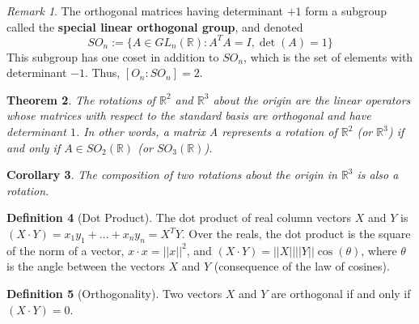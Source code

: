 \documentclass[12pt]{article}
\newtheorem{thm}{Theorem}[section]
\newtheorem{cor}[thm]{Corollary}
\theoremstyle{definition}
\newtheorem{defn}[thm]{Definition}
\theoremstyle{remark}
\newtheorem{rmk}[thm]{Remark}
\numberwithin{equation}{section}
\newcommand\R{\mathbb R}    %
\newcommand\B[1]{\textbf{ #1}}
\begin{document}
\vspace{15pt}

\begin{rmk}
        The orthogonal matrices having determinant $+1$ form a subgroup called the \B{special linear orthogonal group}, and denoted \begin{equation}
                SO_n :=\{A \in GL_n(\R): A^TA= I, \det(A) = 1\}
        \end{equation}
        This subgroup has one coset in addition to $SO_n$, which is the set of elements with determinant $-1$. Thus, $[O_n:SO_n] = 2$.
\end{rmk}

\vspace{15pt}

\begin{thm}
        The rotations of $\R^2$ and $\R^3$ about the origin are the linear operators whose matrices with respect to the standard basis are orthogonal and have determinant $1$. In other words, a matrix A represents a rotation of $\R^2$ (or $\R^3$) if and only if $A \in SO_2(\R)$ (or $SO_3(\R)$).
\end{thm}

\vspace{15pt}

\begin{cor}
        The composition of two rotations about the origin in $\R^3$ is also a rotation.
\end{cor}

\vspace{15pt}

\begin{defn}[Dot Product]
        The dot product of real column vectors $X$ and $Y$ is $(X\cdot Y) = x_1y_1 + ... + x_ny_n = X^TY$. Over the reals, the dot product is the square of the norm of a vector, $x\cdot x = ||x||^2$, and $(X\cdot Y) = ||X||||Y||\cos(\theta)$, where $\theta$ is the angle between the vectors $X$ and $Y$ (consequence of the law of cosines).
\end{defn}

\vspace{15pt}

\begin{defn}[Orthogonality]
        Two vectors $X$ and $Y$ are orthogonal if and only if $(X\cdot Y) = 0$.
\end{defn}

\vspace{15pt}
\end{document}
